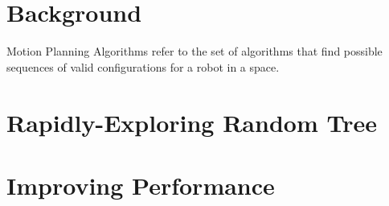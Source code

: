 
\section{Background}
Motion Planning Algorithms refer to the set of algorithms that find possible sequences of valid configurations for a robot in a space.
\newline
\newline
{}

\newpage
\section{Rapidly-Exploring Random Tree}
    

\section{Improving Performance}